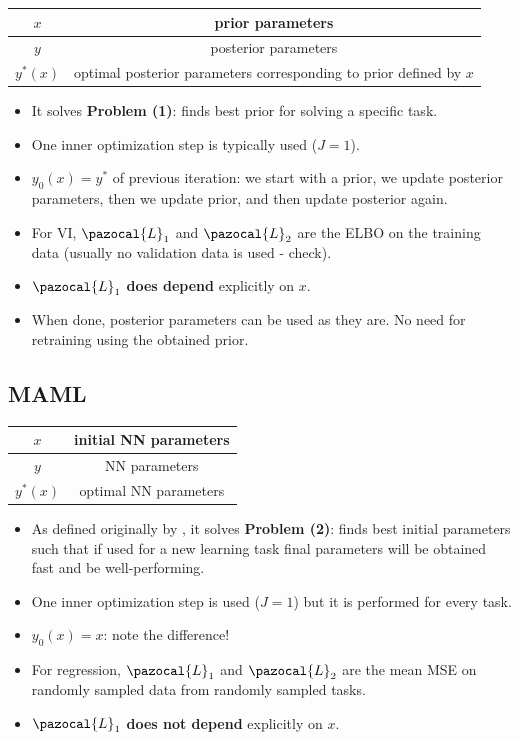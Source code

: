 \begin{center}
	\begin{tabular}{ | c || c |} 
		\hline
		$x$ & prior parameters \\
		\hline
		$y$ & posterior parameters \\
		\hline
		$y^*(x)$ & optimal posterior parameters corresponding to prior defined by $x$ \\
		\hline
	\end{tabular}
\end{center}
\begin{itemize}
	\item It solves \textbf{Problem (1)}: finds best prior for solving a specific task.
	\item One inner optimization step is typically used ($J = 1$).
	\item $y_0(x) = y^*$ of previous iteration: we start with a prior, we update posterior parameters, then we update prior, and then update posterior again.
	\item For VI, $\pazocal{L}_1$ and $\pazocal{L}_2$ are the ELBO on the training data (usually no validation data is used - check).
	\item $\pazocal{L}_1$ \textbf{does depend} explicitly on $x$.
	\item When done, posterior parameters can be used as they are. No need for retraining using the obtained prior.
\end{itemize}

\subsection{MAML}

\begin{center}
	\begin{tabular}{ | c || c |} 
		\hline
		$x$ & initial NN parameters \\
		\hline
		$y$ & NN parameters \\
		\hline
		$y^*(x)$ & optimal NN parameters \\
		\hline
	\end{tabular}
\end{center}
\begin{itemize}
	\item As defined originally by \textcite{finn2017modelagnostic}, it solves \textbf{Problem (2)}: finds best initial parameters such that if used for a new learning task final parameters will be obtained fast and be well-performing.
	\item One inner optimization step is used ($J = 1$) but it is performed for every task.
	\item $y_0(x) = x$: note the difference!
	\item For regression, $\pazocal{L}_1$ and $\pazocal{L}_2$ are the mean MSE on randomly sampled data from randomly sampled tasks.
	\item $\pazocal{L}_1$ \textbf{does not depend} explicitly on $x$.
\end{itemize}

